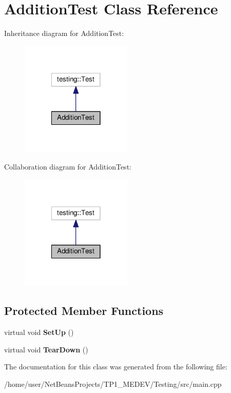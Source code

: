 \hypertarget{classAdditionTest}{\section{Addition\+Test Class Reference}
\label{classAdditionTest}
}


Inheritance diagram for Addition\+Test\+:
\nopagebreak
\begin{figure}[H]
\begin{center}
\leavevmode
\includegraphics[width=150pt]{classAdditionTest__inherit__graph}
\end{center}
\end{figure}


Collaboration diagram for Addition\+Test\+:
\nopagebreak
\begin{figure}[H]
\begin{center}
\leavevmode
\includegraphics[width=150pt]{classAdditionTest__coll__graph}
\end{center}
\end{figure}
\subsection*{Protected Member Functions}
\begin{DoxyCompactItemize}
\item 
\hypertarget{classAdditionTest_a897f60ea7de95614df18a394384c17c4}{virtual void {\bfseries Set\+Up} ()}\label{classAdditionTest_a897f60ea7de95614df18a394384c17c4}

\item 
\hypertarget{classAdditionTest_abaf2f2b7a8583aa8db8944d79bdaf50e}{virtual void {\bfseries Tear\+Down} ()}\label{classAdditionTest_abaf2f2b7a8583aa8db8944d79bdaf50e}

\end{DoxyCompactItemize}


The documentation for this class was generated from the following file\+:\begin{DoxyCompactItemize}
\item 
/home/user/\+Net\+Beans\+Projects/\+T\+P1\+\_\+\+M\+E\+D\+E\+V/\+Testing/src/main.\+cpp\end{DoxyCompactItemize}
